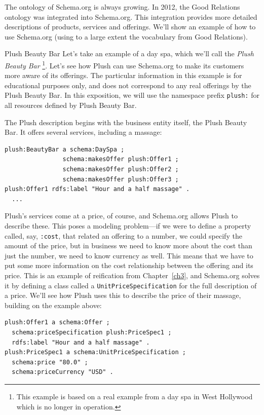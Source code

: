 The ontology of Schema.org is always growing.  In 2012, the Good Relations ontology
was integrated into Schema.org.  This integration provides more detailed descriptions of 
products, services and offerings.  We'll show an example of how to use Schema.org 
(using to a large extent the vocabulary from Good Relations).

\begin{example}{Plush Beauty Bar}
\label{Plushex}
Let's take an example of a day spa, which we'll call the 
\emph{Plush Beauty Bar} \footnote{This example is based on a real example from 
a day spa in West Hollywood which is no longer in operation.}.   Let's see how
Plush can use Schema.org to make its customers more aware of its
offerings. 
The particular information in this example is
for educational purposes only, and does not correspond to any real
offerings by the Plush Beauty Bar. In this exposition, we will use the
namespace prefix \texttt{plush:} for all resources defined by Plush Beauty Bar.

The Plush description begins with the business entity itself, the
Plush Beauty Bar. It offers several services,
including a massage:

\begin{lstlisting}
plush:BeautyBar a schema:DaySpa ;
                schema:makesOffer plush:Offer1 ;
                schema:makesOffer plush:Offer2 ;
                schema:makesOffer plush:Offer3 ;
plush:Offer1 rdfs:label "Hour and a half massage" .
  ...
\end{lstlisting}


Plush's services come at a price, of course, and Schema.org allows Plush to
describe these.   This poses a modeling problem---if we were to
define a property called, say, \texttt{:cost}, that related an offering to a
number, we could specify the amount of the price, but in business we
need to know more about the cost than just the number, we need to know
currency as well. This means that we have to put some more information
on the cost relationship between the offering and its price. This is an
example of reification from Chapter~\ref{ch3}, and Schema.org
solves it by defining a
class called a \texttt{UnitPriceSpecification} for the full description of a
price. We'll see how Plush uses this to describe the price of their
massage, building on the example above:

\begin{lstlisting}
plush:Offer1 a schema:Offer ;
  schema:priceSpecification plush:PriceSpec1 ;
  rdfs:label "Hour and a half massage" .
plush:PriceSpec1 a schema:UnitPriceSpecification ;
  schema:price "80.0" ;
  schema:priceCurrency "USD" .
\end{lstlisting}


\end{example}
